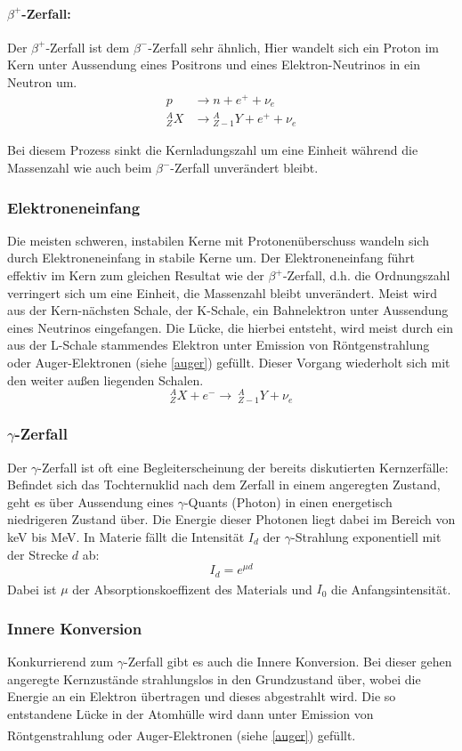 \documentclass[12pt,listof=totoc]{scrartcl}
\begin{document}
\paragraph*{$\beta^+$-Zerfall:}
Der $\beta^+$-Zerfall ist dem $\beta^-$-Zerfall sehr ähnlich, Hier wandelt sich ein Proton im Kern unter Aussendung eines Positrons und eines Elektron-Neutrinos in ein Neutron um.
\begin{align*}
p &\rightarrow n + e^+ + \nu_e\\
{}_Z^A X &\rightarrow {}_{Z-1}^A Y + e^+ + \nu_e
\end{align*}

Bei diesem Prozess sinkt die Kernladungszahl um eine Einheit während die Massenzahl wie auch beim $\beta^-$-Zerfall unverändert bleibt.

\subsubsection{Elektroneneinfang}
Die meisten schweren, instabilen Kerne mit Protonenüberschuss wandeln sich durch Elektroneneinfang in stabile Kerne um.
Der Elektroneneinfang führt effektiv im Kern zum gleichen Resultat wie der $\beta^+$-Zerfall, d.h. die Ordnungszahl verringert sich um eine Einheit, die Massenzahl bleibt unverändert. Meist wird aus der Kern-nächsten Schale, der K-Schale, ein Bahnelektron unter Aussendung eines Neutrinos eingefangen. Die Lücke, die hierbei entsteht, wird meist durch ein aus der L-Schale stammendes Elektron unter Emission von Röntgenstrahlung oder Auger-Elektronen (siehe \ref{auger}) gefüllt. Dieser Vorgang wiederholt sich mit den weiter außen liegenden Schalen.
\[{}_Z^A X + e^- \rightarrow\ {}_{Z-1}^A Y + \nu_e\]
\subsubsection{$\gamma$-Zerfall}

Der $\gamma$-Zerfall ist oft eine Begleiterscheinung der bereits diskutierten Kernzerfälle: Befindet sich das Tochternuklid nach dem Zerfall in einem angeregten Zustand, geht es über Aussendung eines $\gamma$-Quants (Photon)  in einen energetisch niedrigeren Zustand über. Die Energie dieser Photonen liegt dabei im Bereich von keV bis MeV. In Materie fällt die Intensität $I_d$ der $\gamma$-Strahlung exponentiell mit der Strecke $d$ ab:
\[I_d=e^{\mu d}\]
Dabei ist $\mu$ der Absorptionskoeffizent des Materials und $I_0$ die Anfangsintensität.\textsuperscript{\cite{Demtröder}}

\subsubsection{Innere Konversion}
Konkurrierend zum $\gamma$-Zerfall gibt es auch die Innere Konversion. Bei dieser gehen angeregte Kernzustände strahlungslos in den Grundzustand über, wobei die Energie an ein Elektron übertragen und dieses abgestrahlt wird. Die so entstandene Lücke in der Atomhülle wird dann unter Emission von Röntgenstrahlung oder Auger-Elektronen (siehe \ref{auger}) gefüllt.\textsuperscript{\cite{anleitung1}}
\end{document}
